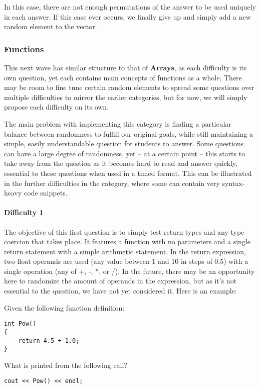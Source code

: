 \documentclass{article}
\begin{document}
In this case, there are not enough permutations of the answer to be used uniquely in each answer. If this case ever occurs, we finally give up and simply add a new random element to the 
vector.

\subsubsection{Functions} \label{subsubsec-functions}

This next wave has similar structure to that of \textbf{Arrays}, as each difficulty is its own question, yet each contains main concepts of functions as a whole. There may be room to fine tune certain 
random elements to spread some questions over multiple difficulties to mirror the earlier categories, but for now, we will simply propose each difficulty on its own. 

The main problem with implementing this category is finding a particular balance between randomness to fulfill our original goals, while still maintaining a simple, easily understandable question for students to answer. Some questions can have a large degree of randomness, yet -- at a certain point -- this starts to take away from the question as it becomes hard to read and answer quickly, essential to these questions when used in a timed format. This can be illustrated in the further difficulties in the category, where some can contain very syntax-heavy code snippets.

\paragraph{Difficulty 1} \hfill \par

The objective of this first question is to simply test return types and any type coercion that takes place. It features a function with no parameters and a single return statement with a simple arithmetic statement. In the return expression, two float operands are used (any value between 1 and 10 in steps of 0.5) with a single operation (any of +, -, *, or /). In the future, there may be an opportunity here to randomize the amount of operands in the expression, but as it's not essential to the question, we have not yet considered it. Here is an example:

\begin{VerbCM}
Given the following function definition:
\end{VerbCM}
\begin{lstlisting}
int Pow() 
{ 
	return 4.5 + 1.0; 
}
\end{lstlisting}
\begin{VerbCM}
What is printed from the following call? 
\end{VerbCM}
\begin{lstlisting}
cout << Pow() << endl; 
\end{lstlisting}
\end{document}
